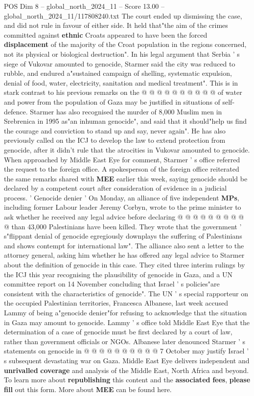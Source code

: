 \begin{textsample}{POS Dim 8 – global\_north\_2024\_11 – Score 13.00 – global\_north\_2024\_11/117808240.txt}
The court ended up dismissing the case, and did not rule in favour of either side.
It held that"the aim of the crimes committed against \textbf{ethnic} Croats appeared to have been the forced \textbf{displacement} of the majority of the Croat population in the regions concerned, not its physical or biological destruction".
In his legal argument that Serbia ' s siege of Vukovar amounted to genocide, Starmer said the city was reduced to rubble, and endured a"sustained campaign of shelling, systematic expulsion, denial of food, water, electricity, sanitation and medical treatment".
This is in stark contrast to his previous remarks on the @ @ @ @ @ @ @ @ @ @ of water and power from the population of Gaza may be justified in situations of self-defence.
Starmer has also recognised the murder of 8,000 Muslim men in Srebrenica in 1995 as"an inhuman genocide", and said that it should"help us find the courage and conviction to stand up and say, never again".
He has also previously called on the ICJ to develop the law to extend protection from genocide, after it didn't rule that the atrocities in Vukovar amounted to genocide.
When approached by Middle East Eye for comment, Starmer ' s office referred the request to the foreign office.
A spokesperson of the foreign office reiterated the same remarks shared with \textbf{MEE} earlier this week, saying genocide should be declared by a competent court after consideration of evidence in a judicial process. ' Genocide denier ' On Monday, an alliance of five independent \textbf{MPs}, including former Labour leader Jeremy Corbyn, wrote to the prime minister to ask whether he received any legal advice before declaring @ @ @ @ @ @ @ @ @ @ than 43,000 Palestinians have been killed.
They wrote that the government ' s"flippant denial of genocide egregiously downplays the suffering of Palestinians and shows contempt for international law".
The alliance also sent a letter to the attorney general, asking him whether he has offered any legal advice to Starmer about the definition of genocide in this case.
They cited three interim rulings by the ICJ this year recognising the plausibility of genocide in Gaza, and a UN committee report on 14 November concluding that Israel ' s policies"are consistent with the characteristics of genocide".
The UN ' s special rapporteur on the occupied Palestinian territories, Francesca Albanese, last week accused Lammy of being a"genocide denier"for refusing to acknowledge that the situation in Gaza may amount to genocide.
Lammy ' s office told Middle East Eye that the determination of a case of genocide must be first declared by a court of law, rather than government officials or NGOs.
Albanese later denounced Starmer ' s statements on genocide in @ @ @ @ @ @ @ @ @ @ 7 October may justify Israel ' s subsequent devastating war on Gaza.
Middle East Eye delivers independent and \textbf{unrivalled} \textbf{coverage} and analysis of the Middle East, North Africa and beyond.
To learn more about \textbf{republishing} this content and the \textbf{associated} \textbf{fees}, \textbf{please} \textbf{fill} out this form.
More about \textbf{MEE} can be found here.


\end{textsample}
